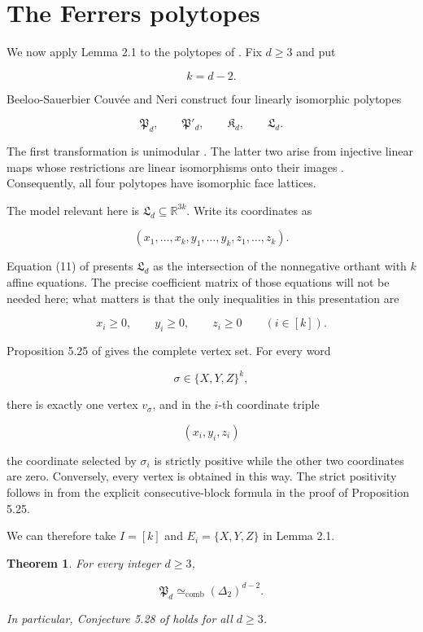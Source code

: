 \documentclass[11pt]{article}
\newtheorem{theorem}{Theorem}[section]
\theoremstyle{remark}
\numberwithin{equation}{section}
\begin{document}
\section{The Ferrers polytopes}


We now apply Lemma 2.1 to the polytopes of \cite{couvee2026}. Fix $d\geq3$ and put

\nopagebreak[4]
\[
k=d-2.
\]

Beeloo-Sauerbier Couvée and Neri construct four linearly isomorphic polytopes

\nopagebreak[4]
\[
\mathfrak P_d,
\qquad
\mathfrak P'_d,
\qquad
\mathfrak K_d,
\qquad
\mathfrak L_d.
\tag{3.1}
\]

The first transformation is unimodular \cite[Lemma 5.23]{couvee2026}. The latter two arise
from injective linear maps whose restrictions are linear isomorphisms onto
their images \cite[Lemma 5.24 and the definitions following it]{couvee2026}. Consequently,
all four polytopes have isomorphic face lattices.

The model relevant here is $\mathfrak L_d\subseteq\mathbb R^{3k}$. Write its
coordinates as

\nopagebreak[4]
\[
(x_1,\ldots,x_k,y_1,\ldots,y_k,z_1,\ldots,z_k).
\]

Equation (11) of \cite{couvee2026} presents $\mathfrak L_d$ as the intersection of the
nonnegative orthant with $k$ affine equations. The precise coefficient matrix
of those equations will not be needed here; what matters is that the only
inequalities in this presentation are

\nopagebreak[4]
\[
x_i\geq0,
\qquad
y_i\geq0,
\qquad
z_i\geq0
\qquad(i\in[k]).
\tag{3.2}
\]

Proposition 5.25 of \cite{couvee2026} gives the complete vertex set. For every word

\nopagebreak[4]
\[
\sigma\in\{X,Y,Z\}^{k},
\]

there is exactly one vertex $v_\sigma$, and in the $i$-th coordinate triple

\nopagebreak[4]
\[
(x_i,y_i,z_i)
\]

the coordinate selected by $\sigma_i$ is strictly positive while the other
two coordinates are zero. Conversely, every vertex is obtained in this way.
The strict positivity follows in \cite{couvee2026} from the explicit consecutive-block
formula in the proof of Proposition 5.25.

We can therefore take $I=[k]$ and $E_i=\{X,Y,Z\}$ in Lemma 2.1.

\Needspace{0.32\textheight}
\begin{theorem}

For every integer $d\geq3$,

\nopagebreak[4]
\[
\mathfrak P_d\simeq_{\mathrm{comb}}(\Delta_2)^{d-2}.
\tag{3.3}
\]

In particular, Conjecture 5.28 of \cite{couvee2026} holds for all $d\geq3$.

\end{theorem}
\end{document}

